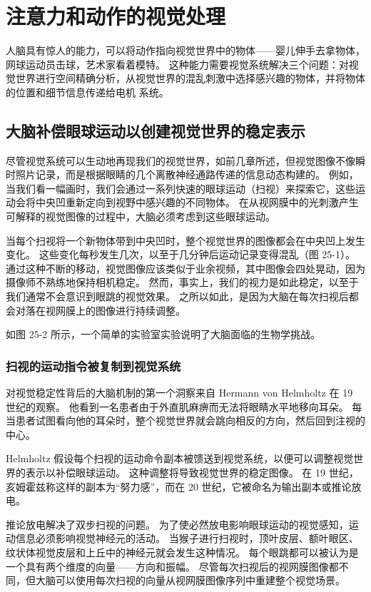 \chapter{注意力和动作的视觉处理}
人脑具有惊人的能力，可以将动作指向视觉世界中的物体——婴儿伸手去拿物体，网球运动员击球，艺术家看着模特。 这种能力需要视觉系统解决三个问题：对视觉世界进行空间精确分析，从视觉世界的混乱刺激中选择感兴趣的物体，并将物体的位置和细节信息传递给电机 系统。

\section{大脑补偿眼球运动以创建视觉世界的稳定表示}
尽管视觉系统可以生动地再现我们的视觉世界，如前几章所述，但视觉图像不像瞬时照片记录，而是根据眼睛的几个离散神经通路传递的信息动态构建的。 例如，当我们看一幅画时，我们会通过一系列快速的眼球运动（扫视）来探索它，这些运动会将中央凹重新定向到视野中感兴趣的不同物体。 在从视网膜中的光刺激产生可解释的视觉图像的过程中，大脑必须考虑到这些眼球运动。

当每个扫视将一个新物体带到中央凹时，整个视觉世界的图像都会在中央凹上发生变化。 这些变化每秒发生几次，以至于几分钟后运动记录变得混乱（图 25-1）。 通过这种不断的移动，视觉图像应该类似于业余视频，其中图像会四处晃动，因为摄像师不熟练地保持相机稳定。 然而，事实上，我们的视力是如此稳定，以至于我们通常不会意识到眼跳的视觉效果。 之所以如此，是因为大脑在每次扫视后都会对落在视网膜上的图像进行持续调整。

如图 25-2 所示，一个简单的实验室实验说明了大脑面临的生物学挑战。

\subsection{扫视的运动指令被复制到视觉系统}

对视觉稳定性背后的大脑机制的第一个洞察来自 Hermann von Helmholtz 在 19 世纪的观察。 他看到一名患者由于外直肌麻痹而无法将眼睛水平地移向耳朵。 每当患者试图看向他的耳朵时，整个视觉世界就会跳向相反的方向，然后回到注视的中心。

Helmholtz 假设每个扫视的运动命令副本被馈送到视觉系统，以便可以调整视觉世界的表示以补偿眼球运动。 这种调整将导致视觉世界的稳定图像。 在 19 世纪，亥姆霍兹称这样的副本为“努力感”，而在 20 世纪，它被命名为输出副本或推论放电。

推论放电解决了双步扫视的问题。 为了使必然放电影响眼球运动的视觉感知，运动信息必须影响视觉神经元的活动。 当猴子进行扫视时，顶叶皮层、额叶眼区、纹状体视觉皮层和上丘中的神经元就会发生这种情况。 每个眼跳都可以被认为是一个具有两个维度的向量——方向和振幅。 尽管每次扫视后的视网膜图像都不同，但大脑可以使用每次扫视的向量从视网膜图像序列中重建整个视觉场景。

